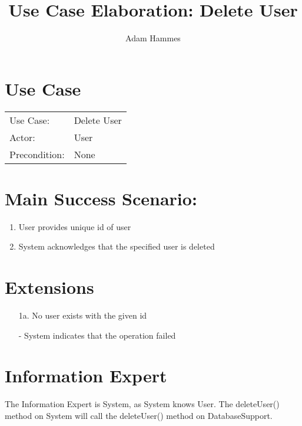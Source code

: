\documentclass{article}
\title{Use Case Elaboration: Delete User}
\author{ Adam Hammes }
\begin{document}
\maketitle


\section*{Use Case}
\begin{tabular}{l l}
Use Case:     & Delete User\\
Actor:        & User\\
Precondition: & None\\
\end{tabular}


\section*{Main Success Scenario:}

\begin{enumerate}
    \item User provides unique id of user
    \item System acknowledges that the specified user is deleted

\end{enumerate}

\section*{Extensions}

\begin{itemize}
    \item [1a.] No user exists with the given id
                
    - System indicates that the operation failed

\end{itemize}


\section*{Information Expert}

The Information Expert is System, as System knows User.
The deleteUser() method on System will call the deleteUser() method on DatabaseSupport.
\end{document}
